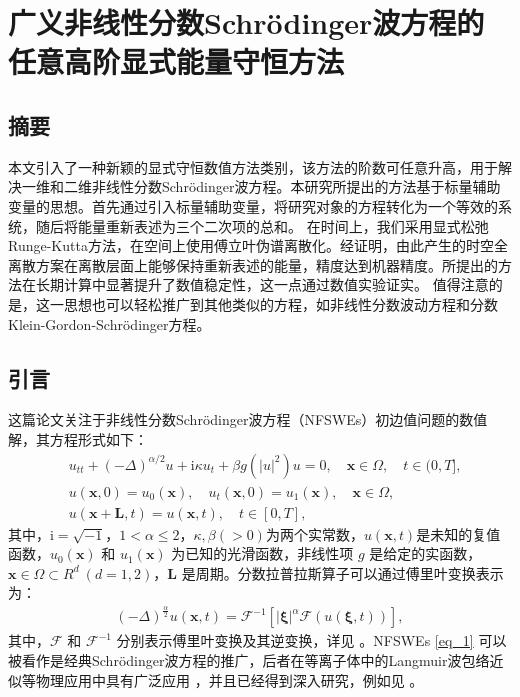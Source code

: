 \chapter[广义非线性分数Schr{\"o}dinger波方程的任意高阶显式能量守恒方法]{广义非线性分数Schr{\"o}dinger波方程的任意高阶显式能量守恒方法
}
\section*{摘要}

本文引入了一种新颖的显式守恒数值方法类别，该方法的阶数可任意升高，用于解决一维和二维非线性分数Schr{\"o}dinger波方程。本研究所提出的方法基于标量辅助变量的思想。首先通过引入标量辅助变量，将研究对象的方程转化为一个等效的系统，随后将能量重新表述为三个二次项的总和。
在时间上，我们采用显式松弛Runge-Kutta方法，在空间上使用傅立叶伪谱离散化。经证明，由此产生的时空全离散方案在离散层面上能够保持重新表述的能量，精度达到机器精度。所提出的方法在长期计算中显著提升了数值稳定性，这一点通过数值实验证实。
值得注意的是，这一思想也可以轻松推广到其他类似的方程，如非线性分数波动方程和分数Klein-Gordon-Schr{\"o}dinger方程。
\section{引言}
这篇论文关注于非线性分数Schr{\"o}dinger波方程（NFSWEs）初边值问题的数值解，其方程形式如下：
\begin{align}
&  u_{t t}+(-\Delta)^{\alpha / 2} u+\mathrm{i} \kappa u_{t}+\beta g(|u|^{2}) u=0, \quad \boldsymbol{x} \in \Omega, \quad  t \in(0, T],\label{eq_1}\\
& u(\boldsymbol{x}, 0)=u_{0}(\boldsymbol{x}), \quad u_{t}(\boldsymbol{x}, 0)=u_{1}(\boldsymbol{x}),\quad \boldsymbol{x} \in \Omega, \label{eq_2}\\
& u(\boldsymbol{x}+\boldsymbol{L}, t)=u(\boldsymbol{x}, t), \quad t \in[0, T],\label{eq_3}
\end{align}
其中，$\mathrm{i}=\sqrt{-1}$，$1<\alpha \leq 2$，$\kappa, \beta(>0)$为两个实常数，$u(\boldsymbol{x}, t)$是未知的复值函数，$u_{0}(\boldsymbol{x})$ 和 $u_{1}(\boldsymbol{x})$ 为已知的光滑函数，非线性项 $g$ 是给定的实函数，$\boldsymbol{x}\in\Omega\!\subset\!
R^d~(d\!=\!1,2)$，$\boldsymbol{L}$ 是周期。分数拉普拉斯算子可以通过傅里叶变换表示为：
\begin{align}\label{eq_4}
(-\Delta)^{\frac{\alpha}{2}} u(\boldsymbol{x},t)=\mathcal{F}^{-1}\left[|\boldsymbol{\xi}|^{\alpha} \mathcal{F}(u(\boldsymbol{\xi},t))\right],
\end{align}
其中，$\mathcal{F}$ 和 $\mathcal{F}^{-1}$ 分别表示傅里叶变换及其逆变换，详见 \cite{caffarelliExtensionProblemRelated2007}。NFSWEs \eqref{eq_1} 可以被看作是经典Schr{\"o}dinger波方程的推广，后者在等离子体中的Langmuir波包络近似等物理应用中具有广泛应用 \cite{colinSemidiscretizationTimeNonlinear1998}，并且已经得到深入研究，例如见 \cite{zhangConservativeNumericalScheme2003,baoUniformErrorEstimates2012,chengSeveralConservativeCompact2018,brugnanoClassEnergyconservingHamiltonian2018}。

